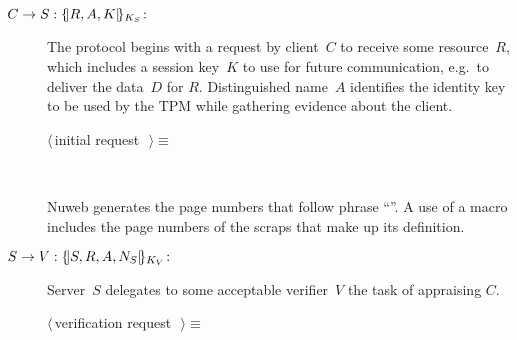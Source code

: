 \documentclass[titlepage,12pt]{article}
\theoremstyle{definition}
\begin{document}
\begin{description}
\item[$C\to S:\{\!|R,A,K|\!\}_{K_S}\colon$]
The protocol begins with a request by client~$C$ to receive some
resource~$R$, which includes a session key~$K$ to use for future
communication, e.g.\ to deliver the data~$D$ for $R$.  Distinguished
name~$A$ identifies the identity key to be used by the TPM while
gathering evidence about the client.
\begin{flushleft} \small
\begin{minipage}{\linewidth} \label{scrap1}
$\langle\,$initial request\nobreak\ {\footnotesize {}}$\,\rangle\equiv$
\vspace{-1ex}
\vspace{-1ex}
\footnotesize\addtolength{\baselineskip}{-1ex}
\end{minipage}\\[4ex]
\end{flushleft}
Nuweb generates the page numbers that follow phrase
``\NWtxtMacroRefIn''.  A use of a macro includes the page numbers
of the scraps that make up its definition.
\item[$S\to V:\{\!|S,R,A,N_S|\!\}_{K_V}\colon$]
Server~$S$ delegates to some acceptable verifier~$V$ the task of
appraising $C$.
\begin{flushleft} \small
\begin{minipage}{\linewidth} \label{scrap2}
$\langle\,$verification request\nobreak\ {\footnotesize {}}$\,\rangle\equiv$
\vspace{-1ex}
\vspace{-1ex}
\footnotesize\addtolength{\baselineskip}{-1ex}
\end{minipage}
\end{flushleft}
\end{description}
\end{document}
